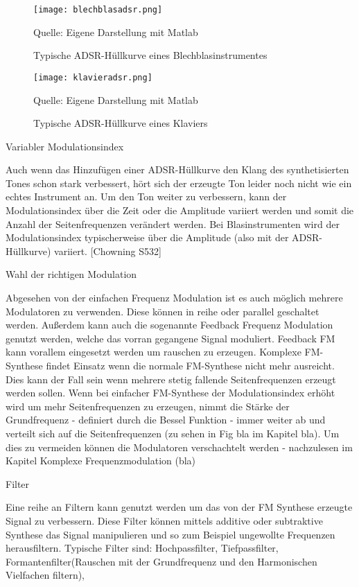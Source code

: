 \begin{figure} [ht]
\centering
  \texttt{[image: blechblasadsr.png]}
\caption{Typische ADSR-Hüllkurve eines Blechblasinstrumentes}
\label{fig:blechblasadsr}
Quelle: Eigene Darstellung mit Matlab
\end{figure}

\begin{figure} [ht]
\centering
  \texttt{[image: klavieradsr.png]}
\caption{Typische ADSR-Hüllkurve eines Klaviers}
\label{fig:klavieradsr}
Quelle: Eigene Darstellung mit Matlab
\end{figure}

Variabler Modulationsindex

Auch wenn das Hinzufügen einer ADSR-Hüllkurve den Klang des synthetisierten Tones schon stark verbessert, hört sich der erzeugte Ton leider noch nicht wie ein echtes Instrument an. Um den Ton weiter zu verbessern, kann der Modulationsindex über die Zeit oder die Amplitude variiert werden und somit die Anzahl der Seitenfrequenzen verändert werden. Bei Blasinstrumenten wird der Modulationsindex typischerweise über die Amplitude (also mit der ADSR-Hüllkurve) variiert. [Chowning S532]

Wahl der richtigen Modulation

Abgesehen von der einfachen Frequenz Modulation ist es auch möglich mehrere Modulatoren zu verwenden. Diese können in reihe oder parallel geschaltet werden. Außerdem kann auch die sogenannte Feedback Frequenz Modulation genutzt werden, welche das vorran gegangene Signal moduliert. Feedback FM kann vorallem eingesetzt werden um rauschen zu erzeugen. Komplexe FM-Synthese findet Einsatz wenn die normale FM-Synthese nicht mehr ausreicht. Dies kann der Fall sein wenn mehrere stetig fallende Seitenfrequenzen erzeugt werden sollen. Wenn bei einfacher FM-Synthese der Modulationsindex erhöht wird um mehr Seitenfrequenzen zu erzeugen, nimmt die Stärke der Grundfrequenz - definiert durch die Bessel Funktion - immer weiter ab und verteilt sich auf die Seitenfrequenzen  (zu sehen in Fig bla im Kapitel bla). Um dies zu vermeiden können die Modulatoren verschachtelt werden - nachzulesen im Kapitel Komplexe Frequenzmodulation (bla)

Filter

Eine reihe an Filtern kann genutzt werden um das von der FM Synthese erzeugte Signal zu verbessern. Diese Filter können mittels additive oder subtraktive Synthese das Signal manipulieren und so zum Beispiel ungewollte Frequenzen herausfiltern. Typische Filter sind: Hochpassfilter, Tiefpassfilter, Formantenfilter(Rauschen mit der Grundfrequenz und den Harmonischen Vielfachen filtern), 

